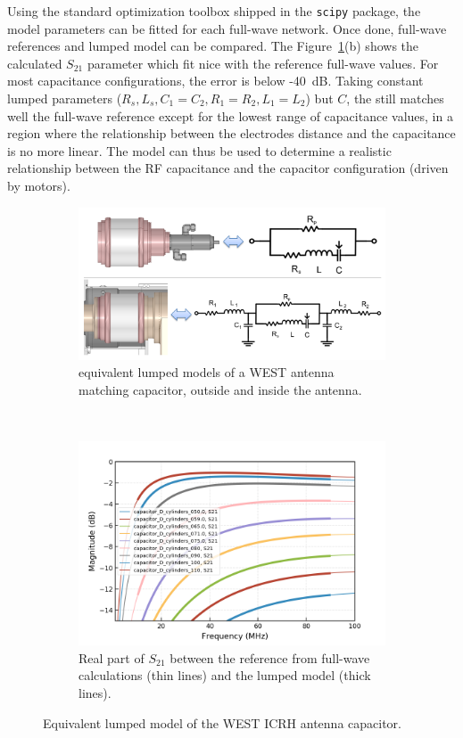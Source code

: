 \documentclass[%
aip,
cp,  %
amsmath,amssymb,%
reprint,%
]{revtex4-2}
\begin{document}
	Using the standard optimization toolbox shipped in the \texttt{scipy} package, the model parameters can be fitted for each full-wave network. Once done, full-wave references and lumped model can be compared. The Figure~\ref{fig:fig2}(b) shows the calculated $S_{21}$ parameter which fit nice with the reference full-wave values. For most capacitance configurations, the error is below -40~dB. Taking constant lumped parameters ($R_s, L_s, C_1=C_2, R_1=R_2, L_1=L_2$) but $C$, the still matches well the full-wave reference except for the lowest range of capacitance values, in a region where the relationship between the electrodes distance and the capacitance is no more linear. The model can thus be used to determine a realistic relationship between the RF capacitance and the capacitor configuration (driven by motors).
	
	\begin{figure}
		\centering
		\begin{subfigure}[t]{0.49\textwidth}
			\centering
			\includegraphics[width=.9\linewidth]{figures/capacitor_equivalent_circuit}
			\caption{equivalent lumped models of a WEST antenna matching capacitor, outside and inside the antenna.}
		\end{subfigure}%
		~
		\begin{subfigure}[t]{0.49\textwidth}
			\centering
			\includegraphics[width=.9\linewidth]{figures/comparison_fullwave_lumped_S21}
			\caption{Real part of $S_{21}$ between the reference from full-wave  calculations (thin lines) and the lumped model (thick lines).}
		\end{subfigure}
		\caption{Equivalent lumped model of the WEST ICRH antenna capacitor.}
		\label{fig:fig2}
	\end{figure}
	
\end{document}
